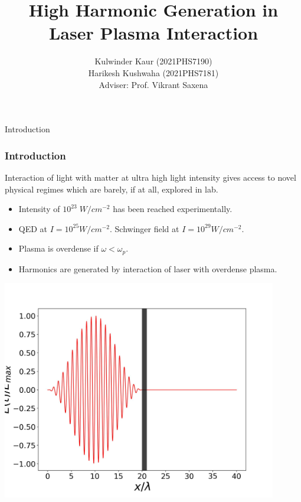 \documentclass{beamer}
\title[High Harmonic Generation]{High Harmonic Generation in Laser Plasma Interaction}
\date{}
\institute[IIT Delhi]{\large Indian Institute of Technology, Delhi}
\author[]{Kulwinder Kaur (2021PHS7190)\\ Harikesh Kushwaha (2021PHS7181)\\[3mm]Adviser: Prof. Vikrant Saxena}
\begin{document}
\maketitle
\begin{frame}{Introduction}
    \frametitle{Introduction}
    \small
    Interaction of light with matter at ultra high light intensity gives access to novel physical regimes which are barely, if at all, explored in lab.
    \begin{itemize}
        \item Intensity of $10^{23} \; W/cm^{-2}$ has been reached experimentally.\footnotemark
        \item QED at $I = 10^{25}W/cm^{-2}$. Schwinger field at $I = 10^{29}W/cm^{-2}$.\footnotemark
        \item Plasma is overdense if $\omega<\omega_p$.
        \item Harmonics are generated by interaction of laser with overdense plasma.\footnotemark
    \end{itemize}
    \begin{minipage}[h]{0.48\linewidth}
        \centering
        \includegraphics[width=0.9\textwidth, height=0.42\textheight]{images/field.jpg}

\end{minipage}
\end{frame}
\end{document}

